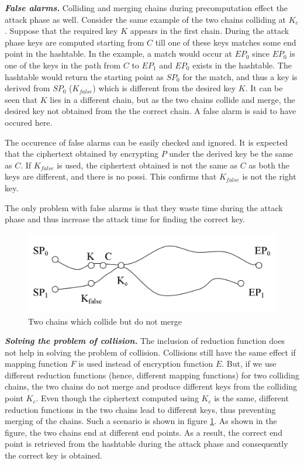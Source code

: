 \noindent \textit{\textbf{False alarms.}} Colliding and merging chains during precomputation effect the attack phase as well. Consider the same example of the two chains colliding at $K_c$. Suppose that the required key $K$ appears in the first chain. During the attack phase keys are computed starting from $C$ till one of these keys matches some end point in the hashtable. 
In the example, a match would occur at $EP_0$ since $EP_0$ is one of the keys in the path from $C$ to $EP_1$ and $EP_0$ exists in the hashtable. The hashtable would return the starting point as $SP_0$ for the match, and thus a key is derived from $SP_0$ ($K_{false}$) which is different from the desired key $K$. It can be seen that $K$ lies in a different chain, but as the two chains collide and merge, the desired key not obtained from the the correct chain. A false alarm is said to have occured here.

The occurence of false alarms can be easily checked and ignored. It is expected that the ciphertext obtained by encrypting $P$ under the derived key be the same as $C$. If $K_{false}$ is used, the ciphertext obtained is not the same as $C$ as both the keys are different, and there is no possi. This confirms that $K_{false}$ is not the right key. 

The only problem with false alarms is that they waste time during the attack phase and thus increase the attack time for finding the correct key.\\

\begin{figure}[ht!]
	\centering
		\includegraphics[width=4.5in]{./figures/collision-not-merge.PNG}
	\caption{Two chains which collide but do not merge}	
	\label{fig:collision-not-merge}
\end{figure}

\noindent \textit{\textbf{Solving the problem of collision.}} The inclusion of reduction function does not help in solving the problem of collision. Collisions still have the same effect if mapping function $F$ is used instead of encryption function $E$. But, if we use different reduction functions (hence, different mapping functions) for two colliding chains, the two chains do not merge and produce different keys from the colliding point $K_c$. Even though the ciphertext computed using $K_c$ is the same, different reduction functions in the two chains lead to different keys, thus preventing merging of the chains. Such a scenario is shown in figure \ref{fig:collision-not-merge}. As shown in the figure, the two chains end at different end points. As a result, the correct end point is retrieved from the hashtable during the attack phase and consequently the correct key is obtained. 


